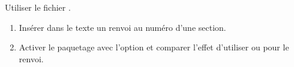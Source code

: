\begin{exercice}
  Utiliser le fichier .
  \begin{enumerate}
  \item Insérer dans le texte un renvoi au numéro d'une section.
  \item Activer le paquetage  avec l'option
     et comparer l'effet d'utiliser  ou
     pour le renvoi.
  \end{enumerate}
\end{exercice}

